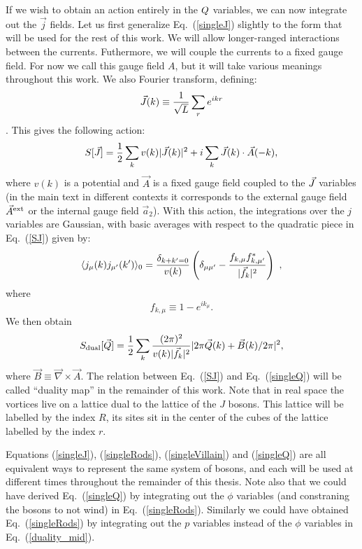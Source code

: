 If we wish to obtain an action entirely in the $Q$ variables, we can now integrate out the $\vec{j}$ fields. Let us first generalize Eq.~(\ref{singleJ}) slightly to the form that will be used for the rest of this work. We will allow longer-ranged interactions between the currents. Futhermore, we will couple the currents to a fixed gauge field. For now we call this gauge field $A$, but it will take various meanings throughout this work. We also Fourier transform, defining:
\begin{equation}
\vec{J}(k)\equiv \frac{1}{\sqrt{L}} \sum_r e^{ikr}
\end{equation}. 
This gives the following action:
\begin{eqnarray}
S[\vec{J}]=\frac{1}{2}\sum_{k} v(k) |\vec{J}(k)|^2 + i\sum_k  \vec{J}(k)\cdot \vec{A}(-k),
\label{SJ}
\end{eqnarray}
where $v(k)$ is a potential and $\vec{A}$ is a fixed gauge field coupled to the $\vec{J}$ variables (in the main text in different contexts it corresponds to the external gauge field ${\vec{A}^{\rm ext}}$ or the internal gauge field $\vec{a}_{2}$).
With this action, the integrations over the $j$ variables are Gaussian, with basic averages with respect to the quadratic piece in Eq.~(\ref{SJ}) given by:
\begin{equation}
\langle j_\mu(k) j_{\mu'}(k') \rangle_0 = \frac{\delta_{k+k'=0}}{v(k)} \left(\delta_{\mu \mu'} - \frac{f_{k,\mu} f_{k,\mu'}^*}{|\vec{f}_k|^2} \right) ~,
\end{equation}
 where 
 \begin{equation}
 f_{k,\mu} \equiv 1 - e^{i k_\mu}.
 \end{equation}
  We then obtain
\begin{equation}
S_{\rm dual}[\vec{Q}] = \frac{1}{2} \sum_k \frac{(2\pi)^2}{v(k) |\vec{f}_k|^2} |2\pi\vec{Q}(k) + \vec{B}(k)/2\pi|^2,
\label{singleQ}
\end{equation}
where $\vec{B} \equiv \vec{\nabla} \times \vec{A}$.  The relation between Eq.~(\ref{SJ}) and Eq.~(\ref{singleQ}) will be called ``duality map'' in the remainder of this work. Note that in real space the vortices live on a lattice dual to the lattice of the $J$ bosons. This lattice will be labelled by the index $R$, its sites sit in the center of the cubes of the lattice labelled by the index $r$. 

Equations (\ref{singleJ}), (\ref{singleRods}), (\ref{singleVillain}) and (\ref{singleQ}) are all equivalent ways to represent the same system of bosons, and each will be used at different times throughout the remainder of this thesis. Note also that we could have derived Eq.~(\ref{singleQ}) by integrating out the $\phi$ variables (and constraning the bosons to not wind) in Eq.~(\ref{singleRods}). Similarly we could have obtained Eq.~(\ref{singleRods}) by integrating out the $p$ variables instead of the $\phi$ variables in Eq.~(\ref{duality_mid}). 

